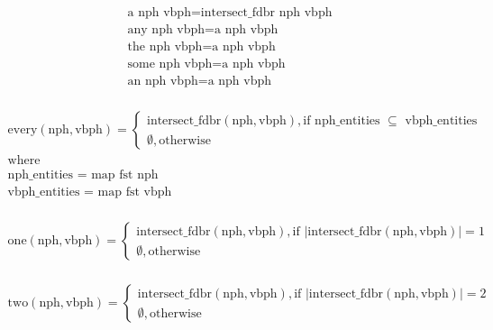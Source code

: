 \documentclass[../main.tex]{subfiles}
\begin{document}
\begin{equation*}
\begin{split}
\text{a nph vbph} = \text{intersect\_fdbr nph vbph} \\
\text{any nph vbph} = \text{a nph vbph}   \\
\text{the nph vbph} = \text{a nph vbph}  \\
\text{some nph vbph} = \text{a nph vbph}   \\
\text{an nph vbph} = \text{a nph vbph}   \\
\end{split}
\end{equation*}
	
\begin{equation*}
\begin{split}
\text{every}(\text{nph}, \text{vbph}) =
\begin{cases}
	\text{intersect\_fdbr}(\text{nph},\text{vbph}), \text{if nph\_entities } \subseteq \text{ vbph\_entities} \\
	\emptyset, \text{otherwise}
\end{cases} \\
\text{where} \\
\text{nph\_entities = map fst nph} \\
\text{vbph\_entities = map fst vbph} \\
\end{split}
\end{equation*}

\begin{equation*}
\begin{split}
\text{one}(\text{nph}, \text{vbph}) =
\begin{cases}
	\text{intersect\_fdbr}(\text{nph},\text{vbph}), \text{if } \left\vert\text{intersect\_fdbr}(\text{nph},\text{vbph})\right\vert = 1 \\
	\emptyset, \text{otherwise}
\end{cases} \\
\end{split}
\end{equation*}

\begin{equation*}
\begin{split}
\text{two}(\text{nph}, \text{vbph}) =
\begin{cases}
\text{intersect\_fdbr}(\text{nph},\text{vbph}), \text{if }\left\vert\text{intersect\_fdbr}(\text{nph},\text{vbph})\right\vert = 2 \\
\emptyset, \text{otherwise}
\end{cases} \\
\end{split}
\end{equation*}
\end{document}
